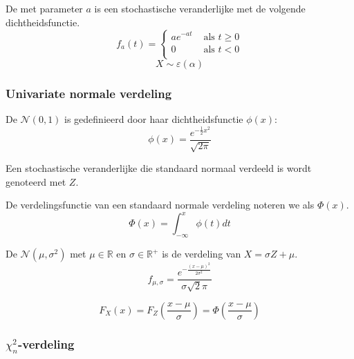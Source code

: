 \documentclass[main.tex]{subfiles}
\begin{document}
\begin{de}
  De  met parameter $a$ is een stochastische veranderlijke met de volgende dichtheidsfunctie.
  \[
  f_{a}(t) =
  \left\{
    \begin{array}{cl}
      ae^{-at} &\text{ als } t \ge 0\\
      0      &\text{ als } t < 0\\
    \end{array}
  \right.
  \]
  \[ X \sim \varepsilon(\alpha) \]
\end{de}

\subsubsection{Univariate normale verdeling}
\label{sec:univ-norm-verd}

\begin{de}
  De  $\mathcal{N}(0,1)$ is gedefinieerd door haar dichtheidsfunctie $\phi(x)$:
  \[ \phi(x) = \frac{e^{-\frac{1}{2}x^{2}}}{\sqrt{2\pi}} \]
\end{de}

\begin{de}
  Een stochastische veranderlijke die standaard normaal verdeeld is wordt genoteerd met $Z$.
\end{de}

\begin{de}
  De verdelingsfunctie van een standaard normale verdeling noteren we als $\Phi(x)$.
  \[ \Phi(x) = \int_{-\infty}^{x}\phi(t)dt \]
\end{de}

\begin{de}
  De  $\mathcal{N}(\mu,\sigma^{2})$ met $\mu \in \mathbb{R}$ en $\sigma \in \mathbb{R}^{+}$ is de verdeling van $X = \sigma Z + \mu$.
  \[ f_{\mu, \sigma} = \frac{e^{-\frac{(x-\mu)^{2}}{2\sigma^{2}}}}{\sigma\sqrt{2}\pi} \]
\end{de}

\begin{st}
  \[ F_{X}(x) = F_{Z} \left( \frac{x-\mu}{\sigma} \right) = \Phi\left( \frac{x-\mu}{\sigma} \right) \]
\end{st}


\subsubsection{$\chi_{n}^2$-verdeling}
\label{sec:chi_n2-verdeling}
\end{document}
